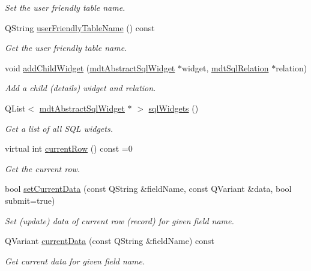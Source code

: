 \begin{DoxyCompactItemize}
\begin{DoxyCompactList}\small\item\em Set the user friendly table name. \end{DoxyCompactList}\item 
QString \hyperlink{classmdt_abstract_sql_widget_a8207edaf31a7d988db5b86a4099ad4eb}{userFriendlyTableName} () const 
\begin{DoxyCompactList}\small\item\em Get the user friendly table name. \end{DoxyCompactList}\item 
void \hyperlink{classmdt_abstract_sql_widget_a7225af05f3b10e82db939f0ec0996167}{addChildWidget} (\hyperlink{classmdt_abstract_sql_widget}{mdtAbstractSqlWidget} $\ast$widget, \hyperlink{classmdt_sql_relation}{mdtSqlRelation} $\ast$relation)
\begin{DoxyCompactList}\small\item\em Add a child (details) widget and relation. \end{DoxyCompactList}\item 
QList$<$ \hyperlink{classmdt_abstract_sql_widget}{mdtAbstractSqlWidget} $\ast$ $>$ \hyperlink{classmdt_abstract_sql_widget_aa1b5762e5573c3e50c528bc0232a2b37}{sqlWidgets} ()
\begin{DoxyCompactList}\small\item\em Get a list of all SQL widgets. \end{DoxyCompactList}\item 
virtual int \hyperlink{classmdt_abstract_sql_widget_ab48f6375f55f1eaba309fb17aaaf5770}{currentRow} () const =0
\begin{DoxyCompactList}\small\item\em Get the current row. \end{DoxyCompactList}\item 
bool \hyperlink{classmdt_abstract_sql_widget_add434461de436509b853fa9184c41360}{setCurrentData} (const QString \&fieldName, const QVariant \&data, bool submit=true)
\begin{DoxyCompactList}\small\item\em Set (update) data of current row (record) for given field name. \end{DoxyCompactList}\item 
QVariant \hyperlink{classmdt_abstract_sql_widget_a10a2d7fff69ec7043db0df05cbbaa63c}{currentData} (const QString \&fieldName) const 
\begin{DoxyCompactList}\small\item\em Get current data for given field name. \end{DoxyCompactList}\item 

\end{DoxyCompactItemize}
